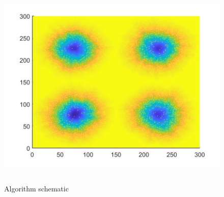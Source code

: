 \documentclass{mcmthesis}
\begin{document}
\begin{figure}[H] 
	\centering 
	\includegraphics[height=10cm]{./T5Figure/K1N1/K1N1L.pdf}
	\caption{Algorithm schematic}
\end{figure}
\end{document}
